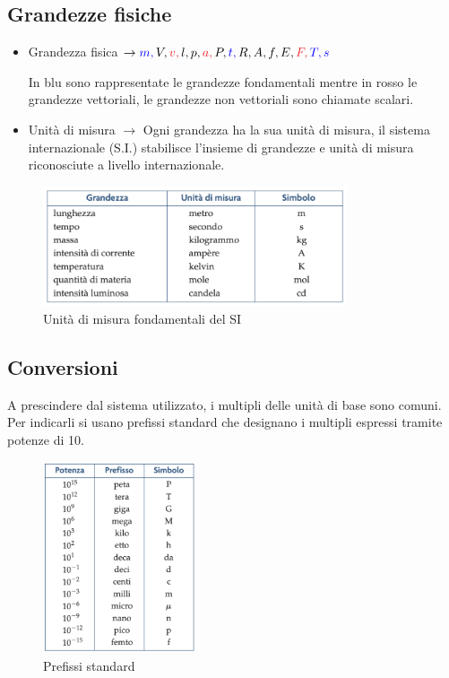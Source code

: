 \documentclass[../main.tex]{subfiles}
\begin{document}
\subsection{Grandezze fisiche}
\begin{itemize}
    \item Grandezza fisica $\rightarrow \color{blue}m, \color{black}V, \color{Red}v, \color{black}l, p, \color{Red}a, \color{black}P, \color{blue}t, \color{black}R, A, f, E, \color{Red}F, \color{blue}T, s$
    \color{black}
    
    In \color{blue}blu \color{black}sono rappresentate le grandezze fondamentali mentre in \color{Red}rosso \color{black}le grandezze vettoriali, le grandezze non vettoriali sono chiamate scalari.
    \item Unità di misura $\rightarrow$ Ogni grandezza ha la sua unità di misura, il sistema internazionale (S.I.) stabilisce l'insieme di grandezze e unità di misura riconosciute a livello internazionale.
\end{itemize}
\begin{figure}[h]
    \centering
    \includegraphics[width=0.8\textwidth]{images/unitaDiMisuraSI.png}
    \caption{Unità di misura fondamentali del SI}
\end{figure}

\subsection{Conversioni}
A prescindere dal sistema utilizzato, i multipli delle unità di base sono comuni. Per indicarli si usano prefissi standard che designano i multipli espressi tramite potenze di 10.
\begin{figure}[h]
    \centering
    \includegraphics[width=0.4\textwidth]{images/prefissiStandard.png}
    \caption{Prefissi standard}
\end{figure}
\end{document}
